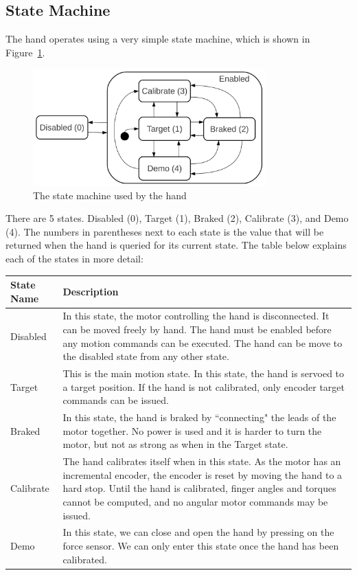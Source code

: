 \documentclass[letterpaper,notitlepage,10pt]{article}
\begin{document}
\subsection{State Machine}

The hand operates using a very simple state machine, which is shown in Figure~\ref{fig:state_machine}.

\begin{figure}[h]
\centering
\includegraphics[width=0.8\textwidth]{figures/state_machine.pdf}
\caption{The state machine used by the hand}
\label{fig:state_machine}
\end{figure}

There are 5 states. Disabled (0), Target (1), Braked (2), Calibrate (3), and Demo (4). The numbers in parentheses next to each state is the value that will be returned when the hand is queried for its current state. The table below explains each of the states in more detail: \\

\begin{tabular}{|l|p{}|}
\hline
\textbf{State Name} & \textbf{Description} \\ \hline
Disabled & In this state, the motor controlling the hand is disconnected. It can be moved freely by hand. The hand must be enabled before any motion commands can be executed. The hand can be move to the disabled state from any other state. \\ \hline
Target & This is the main motion state. In this state, the hand is servoed to a target position. If the hand is not calibrated, only encoder target commands can be issued. \\ \hline
Braked & In this state, the hand is braked by ``connecting" the leads of the motor together. No power is used and it is harder to turn the motor, but not as strong as when in the Target state. \\ \hline
Calibrate & The hand calibrates itself when in this state. As the motor has an incremental encoder, the encoder is reset by moving the hand to a hard stop. Until the hand is calibrated, finger angles and torques cannot be computed, and no angular motor commands may be issued. \\ \hline
Demo & In this state, we can close and open the hand by pressing on the force sensor. We can only enter this state once the hand has been calibrated. \\ \hline
\end{tabular}
\end{document}
